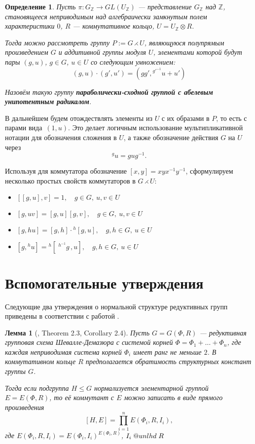 \documentclass[12pt]{matmex-diploma}
\makeatletter
\newcommand{\slunlhd}{%
  \mathrel{\mathpalette\sl@unlhd\relax}%
}
\newcommand{\sl@unlhd}[2]{%
  \sbox\z@{$#1\lhd$}%
  \sbox\tw@{$#1\leqslant$}%
  \dimen@=\ht\tw@
  \advance\dimen@-\ht\z@
  \ifx#1\displaystyle
    \advance\dimen@ .2pt
  \else
    \ifx#1\textstyle
      \advance\dimen@ .2pt
    \fi
  \fi
  \ooalign{\raisebox{\dimen@}{$\m@th#1\lhd$}\cr$\m@th#1\leqslant$\cr}%
}
\theoremstyle{mystyleni}
\theoremstyle{mystyle}
\newtheorem{lm}{Лемма}
\newtheorem{definition}{Определение}
\newenvironment{framed}
    {
\vspace{1.5ex}
\begin{tcolorbox}[colback=white, grow to left by=1.2em, grow to right by=1.2em, enhanced]
    }
    {
\end{tcolorbox}
    }
\newcommand{\Z}{\mathbb{Z}}
\renewcommand{\le}{\leqslant}
\renewcommand{\trianglelefteq}{\slunlhd}
\makeatother
\begin{document}
\begin{framed}
\begin{definition}
Пусть $\pi:G_\Z \to GL(U_\Z)$ --- представление $G_\Z$ над $\Z$, становящееся неприводимым над алгебраически замкнутым полем характеристики $0$, $R$ --- коммутативное кольцо, $U=U_\Z\otimes R$.

Тогда можно рассмотреть группу $P:=G\rightthreetimes U$, являющуюся полупрямым произведением $G$ и аддитивной группы модуля $U$, элементами которой будут пары $(g,u)$, $g \in G$, $u \in U$ со следующим умножением:
$$
(g,u)\cdot (g',u') = (g g', {}^{g'^{-1}} u + u')
$$

Назовём такую группу \textit{\textbf{параболически-сходной группой с абелевым унипотентным радикалом}}.
\end{definition}
\end{framed}

В дальнейшем будем отождествлять элементы из $U$ с их образами в $P$, то есть с парами вида~$(1,u)$.
Это делает логичным использование мультипликативной нотации для обозначения сложения в $U$, а также обозначение действия $G$ на $U$ через $$^{g}u = g u g^{-1}.$$ 

Используя для коммутатора обозначение $[x,y]=x y x^{-1}y^{-1}$,
сформулируем несколько простых свойств коммутаторов в $G \rightthreetimes U$:

\begin{itemize}[label={\LARGE\raisebox{-0.5ex}{\textbullet}\quad},leftmargin=4\parindent]
\item
$[[g,u],v] = 1, \quad g \in G, \ u,v \in U $
\linespread{3}
\item 
$[g,uv] = [g,u][g,v], \quad g \in G, \ u,v \in U $
\item
$[g,hu] = [g,h]\cdot{}^h[g,u], \quad g,h \in G, \ u \in U $
\item
$[g,{}^{h}u] = {}^h[\;{}^{h^{-1}}g\,,u], \quad g,h \in G, \ u \in U $
\end{itemize}

\pagebreak
\section{Вспомогательные утверждения}

Следующие два утверждения о нормальной структуре редуктивных групп приведены в соответствии с работой \citep{Stavrova2009}.

\begin{lm}[\citep{Stavrova2009}, Theorem 2.3, Corollary 2.4]
  \label{directproduct}
  Пусть $G = G(\Phi, R)$ --- редуктивная групповая схема Шевалле-Демазюра
  с системой корней $\Phi = \Phi_1 + \ldots + \Phi_n$, где каждая неприводимая система корней $\Phi_i$ имеет ранг не меньше $2$. В коммутативном кольце $R$ предполагается обратимость структурных констант группы $G$.
  
  Тогда если подгруппа $H \le G$ нормализуется элементарной группой $E = E(\Phi,R)$, то её коммутант с $E$ можно записать в виде прямого произведения
  $$ [H, E] = \prod_{i=1}^n E(\Phi_i,R,I_i), $$
  где $E(\Phi_i,R,I_i) = E(\Phi_i,I_i)^{E(\Phi_i,R)}$, $I_i \trianglelefteq R$
\end{lm}
\end{document}
